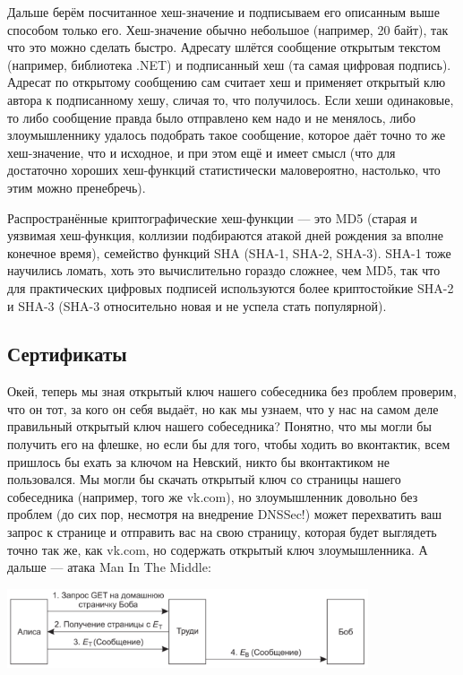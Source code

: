 \documentclass{../../text-style}
\begin{document}
Дальше берём посчитанное хеш-значение и подписываем его описанным выше способом только его. Хеш-значение обычно небольшое (например, 20 байт), так что это можно сделать быстро. Адресату шлётся сообщение открытым текстом (например, библиотека .NET) и подписанный хеш (та самая цифровая подпись). Адресат по открытому сообщению сам считает хеш и применяет открытый клю автора к подписанному хешу, сличая то, что получилось. Если хеши одинаковые, то либо сообщение правда было отправлено кем надо и не менялось, либо злоумышленнику удалось подобрать такое сообщение, которое даёт точно то же хеш-значение, что и исходное, и при этом ещё и имеет смысл (что для достаточно хороших хеш-функций статистически маловероятно, настолько, что этим можно пренебречь).

Распространённые криптографические хеш-функции --- это MD5 (старая и уязвимая хеш-функция, коллизии подбираются атакой дней рождения за вполне конечное время), семейство функций SHA (SHA-1, SHA-2, SHA-3). SHA-1 тоже научились ломать, хоть это вычислительно гораздо сложнее, чем MD5, так что для практических цифровых подписей используются более криптостойкие SHA-2 и SHA-3 (SHA-3 относительно новая и не успела стать популярной).

\subsection{Сертификаты}

Окей, теперь мы зная открытый ключ нашего собеседника без проблем проверим, что он тот, за кого он себя выдаёт, но как мы узнаем, что у нас на самом деле правильный открытый ключ нашего собеседника? Понятно, что мы могли бы получить его на флешке, но если бы для того, чтобы ходить во вконтактик, всем пришлось бы ехать за ключом на Невский, никто бы вконтактиком не пользовался. Мы могли бы скачать открытый ключ со страницы нашего собеседника (например, того же vk.com), но злоумышленник довольно без проблем (до сих пор, несмотря на внедрение DNSSec!) может перехватить ваш запрос к странице и отправить вас на свою страницу, которая будет выглядеть точно так же, как vk.com, но содержать открытый ключ злоумышленника. А дальше --- атака Man In The Middle:

\begin{center}
    \includegraphics[width=0.8\textwidth]{manInTheMiddle.png}
\end{center}
\end{document}
